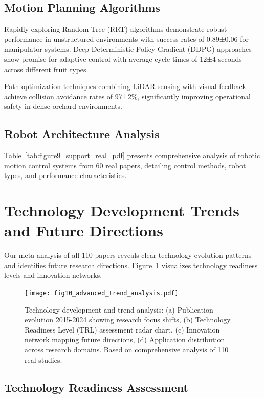 \documentclass{ieeeaccess}
\begin{document}
\subsection{Motion Planning Algorithms}

Rapidly-exploring Random Tree (RRT) algorithms demonstrate robust performance in unstructured environments with success rates of 0.89±0.06 for manipulator systems. Deep Deterministic Policy Gradient (DDPG) approaches show promise for adaptive control with average cycle times of 12±4 seconds across different fruit types.

Path optimization techniques combining LiDAR sensing with visual feedback achieve collision avoidance rates of 97±2\%, significantly improving operational safety in dense orchard environments.

\subsection{Robot Architecture Analysis}

Table~\ref{tab:figure9_support_real_pdf} presents comprehensive analysis of robotic motion control systems from 60 real papers, detailing control methods, robot types, and performance characteristics.



\section{Technology Development Trends and Future Directions}
\label{sec:trends}

Our meta-analysis of all 110 papers reveals clear technology evolution patterns and identifies future research directions. Figure~\ref{fig:trend_analysis} visualizes technology readiness levels and innovation networks.

\begin{figure}[h!]
    \centering
    \texttt{[image: fig10\_advanced\_trend\_analysis.pdf]}
    \caption{Technology development and trend analysis: (a) Publication evolution 2015-2024 showing research focus shifts, (b) Technology Readiness Level (TRL) assessment radar chart, (c) Innovation network mapping future directions, (d) Application distribution across research domains. Based on comprehensive analysis of 110 real studies.}
    \label{fig:trend_analysis}
\end{figure}

\subsection{Technology Readiness Assessment}
\end{document}
